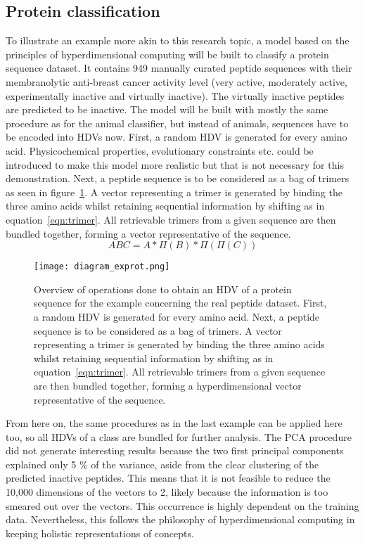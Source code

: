 \subsection*{Protein classification}
\label{ssec:protclas}
To illustrate an example more akin to this research topic, a model based on the principles of hyperdimensional computing will be built to classify a protein sequence dataset\cite{anticancer}. It contains 949 manually curated peptide sequences with their membranolytic anti-breast cancer activity level (very active, moderately active, experimentally inactive and virtually inactive). The virtually inactive peptides are predicted to be inactive. The model will be built with mostly the same procedure as for the animal classifier, but instead of animals, sequences have to be encoded into HDVs now. First, a random HDV is generated for every amino acid. Physicochemical properties, evolutionary constraints etc. could be introduced to make this model more realistic but that is not necessary for this demonstration. Next, a peptide sequence is to be considered as a bag of trimers as seen in figure~\ref{fig:diagram_exprot}. A vector representing a trimer is generated by binding the three amino acids whilst retaining sequential information by shifting as in equation~\ref{eqn:trimer}. All retrievable trimers from a given sequence are then bundled together, forming a vector representative of the sequence. 
\begin{equation}\label{eqn:trimer}
    ABC = A * \Pi (B) * \Pi (\Pi (C))
\end{equation}
\begin{figure}[h]
    \centering
    \texttt{[image: diagram\_exprot.png]}
    \caption{Overview of operations done to obtain an HDV of a protein sequence for the example concerning the real peptide dataset. First, a random HDV is generated for every amino acid. Next, a peptide sequence is to be considered as a bag of trimers. A vector representing a trimer is generated by binding the three amino acids whilst retaining sequential information by shifting as in equation~\ref{eqn:trimer}. All retrievable trimers from a given sequence are then bundled together, forming a hyperdimensional vector representative of the sequence.}
    \label{fig:diagram_exprot}
\end{figure}
From here on, the same procedures as in the last example can be applied here too, so all HDVs of a class are bundled for further analysis. The PCA procedure did not generate interesting results because the two first principal components explained only 5 \% of the variance, aside from the clear clustering of the predicted inactive peptides. This means that it is not feasible to reduce the 10,000 dimensions of the vectors to 2, likely because the information is too smeared out over the vectors. This occurrence is highly dependent on the training data. Nevertheless, this follows the philosophy of hyperdimensional computing in keeping holistic representations of concepts.

